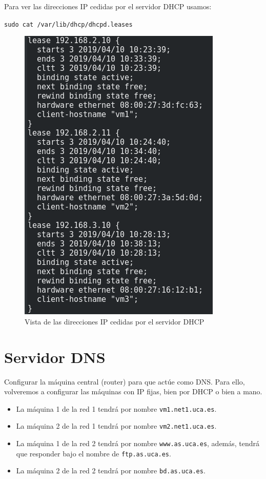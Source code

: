 \documentclass[12pt,letterpaper]{article}
\begin{document}
Para ver las direcciones IP cedidas por el servidor DHCP usamos:
\begin{center}
	\texttt{sudo cat /var/lib/dhcp/dhcpd.leases}
\end{center}
\newpage
\begin{figure}[h]
	\centering
	\includegraphics[scale=0.8]{DHCP3.png}
	\caption{Vista de las direcciones IP cedidas por el servidor DHCP}
\end{figure}

\section{Servidor DNS}
Configurar la máquina central (router) para que actúe como DNS. Para ello, volveremos a configurar las máquinas con IP fijas, bien por DHCP o bien a mano.
\begin{itemize}
	\item La máquina 1 de la red 1 tendrá por nombre \texttt{vm1.net1.uca.es}.
	\item La máquina 2 de la red 1 tendrá por nombre \texttt{vm2.net1.uca.es}.
	\item La máquina 1 de la red 2 tendrá por nombre \texttt{www.as.uca.es}, además, tendrá que responder bajo el nombre de \texttt{ftp.as.uca.es}.
	\item La máquina 2 de la red 2 tendrá por nombre \texttt{bd.as.uca.es}.
\end{itemize}
\end{document}
